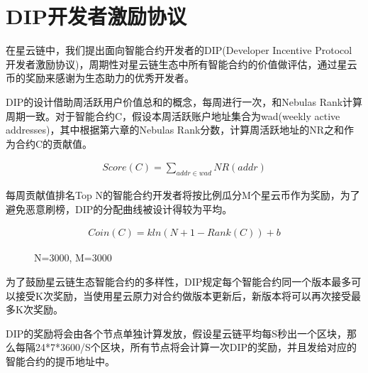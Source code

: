 \section{DIP开发者激励协议}
\label{sec:dip}

在星云链中，我们提出面向智能合约开发者的DIP(Developer Incentive Protocol 开发者激励协议)，周期性对星云链生态中所有智能合约的价值做评估，通过星云币的奖励来感谢为生态助力的优秀开发者。

DIP的设计借助周活跃用户价值总和的概念，每周进行一次，和Nebulas Rank计算周期一致。对于智能合约C，假设本周活跃账户地址集合为wad(weekly active addresses)，其中根据第六章的Nebulas Rank分数，计算周活跃地址的NR之和作为合约C的贡献值。

\begin{align}
Score(C)=\sum_{addr \in wad}NR(addr)
\end{align}

每周贡献值排名Top N的智能合约开发者将按比例瓜分M个星云币作为奖励，为了避免恶意刷榜，DIP的分配曲线被设计得较为平均。

\begin{align}
Coin(C) =kln(N+1-Rank(C))+b
\end{align}

\begin{figure}[htbp] 
\centering
{}
\label{fig:dip}
\caption{N=3000, M=3000}
\end{figure}

为了鼓励星云链生态智能合约的多样性，DIP规定每个智能合约同一个版本最多可以接受K次奖励，当使用星云原力对合约做版本更新后，新版本将可以再次接受最多K次奖励。

DIP的奖励将会由各个节点单独计算发放，假设星云链平均每S秒出一个区块，那么每隔24*7*3600/S个区块，所有节点将会计算一次DIP的奖励，并且发给对应的智能合约的提币地址中。
